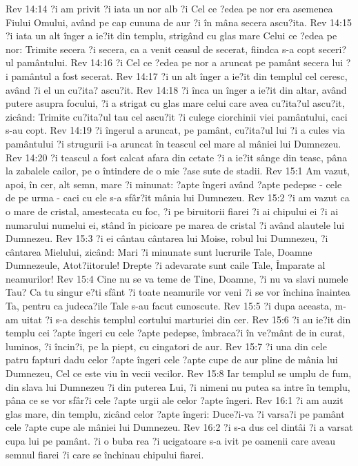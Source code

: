 Rev 14:14  ?i am privit ?i iata un nor alb ?i Cel ce ?edea pe nor era asemenea Fiului Omului, având pe cap cununa de aur ?i în mâna secera ascu?ita.
Rev 14:15  ?i iata un alt înger a ie?it din templu, strigând cu glas mare Celui ce ?edea pe nor: Trimite secera ?i secera, ca a venit ceasul de secerat, fiindca s-a copt seceri?ul pamântului.
Rev 14:16  ?i Cel ce ?edea pe nor a aruncat pe pamânt secera lui ?i pamântul a fost secerat.
Rev 14:17  ?i un alt înger a ie?it din templul cel ceresc, având ?i el un cu?ita? ascu?it.
Rev 14:18  ?i înca un înger a ie?it din altar, având putere asupra focului, ?i a strigat cu glas mare celui care avea cu?ita?ul ascu?it, zicând: Trimite cu?ita?ul tau cel ascu?it ?i culege ciorchinii viei pamântului, caci s-au copt.
Rev 14:19  ?i îngerul a aruncat, pe pamânt, cu?ita?ul lui ?i a cules via pamântului ?i strugurii i-a aruncat în teascul cel mare al mâniei lui Dumnezeu.
Rev 14:20  ?i teascul a fost calcat afara din cetate ?i a ie?it sânge din teasc, pâna la zabalele cailor, pe o întindere de o mie ?ase sute de stadii.
Rev 15:1  Am vazut, apoi, în cer, alt semn, mare ?i minunat: ?apte îngeri având ?apte pedepse - cele de pe urma - caci cu ele s-a sfâr?it mânia lui Dumnezeu.
Rev 15:2  ?i am vazut ca o mare de cristal, amestecata cu foc, ?i pe biruitorii fiarei ?i ai chipului ei ?i ai numarului numelui ei, stând în picioare pe marea de cristal ?i având alautele lui Dumnezeu.
Rev 15:3  ?i ei cântau cântarea lui Moise, robul lui Dumnezeu, ?i cântarea Mielului, zicând: Mari ?i minunate sunt lucrurile Tale, Doamne Dumnezeule, Atot?iitorule! Drepte ?i adevarate sunt caile Tale, Împarate al neamurilor!
Rev 15:4  Cine nu se va teme de Tine, Doamne, ?i nu va slavi numele Tau? Ca tu singur e?ti sfânt ?i toate neamurile vor veni ?i se vor închina înaintea Ta, pentru ca judeca?ile Tale s-au facut cunoscute.
Rev 15:5  ?i dupa aceasta, m-am uitat ?i s-a deschis templul cortului marturiei din cer.
Rev 15:6  ?i au ie?it din templu cei ?apte îngeri cu cele ?apte pedepse, îmbraca?i în ve?mânt de in curat, luminos, ?i încin?i, pe la piept, cu cingatori de aur.
Rev 15:7  ?i una din cele patru fapturi dadu celor ?apte îngeri cele ?apte cupe de aur pline de mânia lui Dumnezeu, Cel ce este viu în vecii vecilor.
Rev 15:8  Iar templul se umplu de fum, din slava lui Dumnezeu ?i din puterea Lui, ?i nimeni nu putea sa intre în templu, pâna ce se vor sfâr?i cele ?apte urgii ale celor ?apte îngeri.
Rev 16:1  ?i am auzit glas mare, din templu, zicând celor ?apte îngeri: Duce?i-va ?i varsa?i pe pamânt cele ?apte cupe ale mâniei lui Dumnezeu.
Rev 16:2  ?i s-a dus cel dintâi ?i a varsat cupa lui pe pamânt. ?i o buba rea ?i ucigatoare s-a ivit pe oamenii care aveau semnul fiarei ?i care se închinau chipului fiarei.
